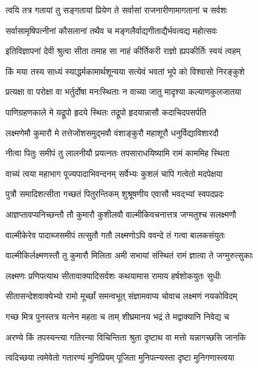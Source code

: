 \twolineshloka
{त्वयि तत्र गतायां तु सङ्गतायां प्रियेण ते}
{सर्वासां राजनारीणामागतानां च सर्वशः}%

\twolineshloka
{सर्वासामृषिपत्नीनां कौसलानां तथैव च}
{मङ्गलैर्वाद्यगीताद्यैर्भवत्वद्य महोत्सवः}%


\twolineshloka
{इतिविज्ञापनां देवी श्रुत्वा सीता तमाह सा}
{नाहं कीर्तिकरी राज्ञो ह्यपकीर्तिः स्वयं त्वहम्}%

\twolineshloka
{किं मया तस्य साध्यं स्याद्धर्मकामार्थशून्यया}
{सत्येवं भवतां भूपे को विश्वासो निरङ्कुशे}%

\twolineshloka
{प्रत्यक्षा वा परोक्षा वा भर्तुर्दोषा मनःस्थिताः}
{न वाच्या जातु मादृश्या कल्याणकुलजातया}%

\twolineshloka
{पाणिग्रहणकाले मे यद्रूपो हृदये स्थितः}
{तद्रूपो हृदयान्नासौ कदाचिदपसर्पति}%

\twolineshloka
{लक्ष्मणेमौ कुमारौ मे तत्तेजोंशसमुद्भवौ}
{वंशाङ्कुरौ महाशूरौ धनुर्विद्याविशारदौ}%

\twolineshloka
{नीत्वा पितुः समीपं तु लालनीयौ प्रयत्नतः}
{तपसाराधयिष्यामि रामं काममिह स्थिता}%

\twolineshloka
{वाच्यं त्वया महाभाग पूज्यपादाभिवन्दनम्}
{सर्वेभ्यः कुशलं चापि गत्वेतो मदपेक्षया}%

\twolineshloka
{पुत्रौ समादिशत्सीता गच्छतं पितुरन्तिकम्}
{शुश्रूषणीय एवासौ भवद्भ्यां स्वपदप्रदः}%

\twolineshloka
{आज्ञप्तावप्यनिच्छन्तौ तौ कुमारौ कुशीलवौ}
{वाल्मीकिवचनात्तत्र जग्मतुश्च सलक्ष्मणौ}%

\twolineshloka
{वाल्मीकेरेव पादाब्जसमीपं तत्सुतौ गतौ}
{लक्ष्मणोऽपि ववन्दे तं गत्वा बालकसंयुतः}%

\twolineshloka
{वाल्मीकिर्लक्ष्मणस्तौ तु कुमारौ मिलिता अमी}
{सभायां संस्थितं रामं ज्ञात्वा ते जग्मुरुत्सुकाः}%

\twolineshloka
{लक्ष्मणः प्रणिपत्याथ सीतावाक्यादिसर्वशः}
{कथयामास रामाय हर्षशोकयुतः सुधीः}%

\twolineshloka
{सीतासन्देशवाक्येभ्यो रामो मूर्च्छां समन्वभूत्}
{संज्ञामवाप्य चोवाच लक्ष्मणं नयकोविदम्}%

\twolineshloka
{गच्छ मित्र पुनस्तत्र यत्नेन महता च ताम्}
{शीघ्रमानय भद्रं ते मद्वाक्यानि निवेद्य च}%

\twolineshloka
{अरण्ये किं तपस्यन्त्या गतिरन्या विचिन्तिता}
{श्रुता दृष्टाथ वा मत्तो यन्नागच्छसि जानकि}%

\twolineshloka
{त्वदिच्छया त्वमेवेतो गतारण्यं मुनिप्रियम्}
{पूजिता मुनिपत्न्यस्ता दृष्टा मुनिगणास्त्वया}%

